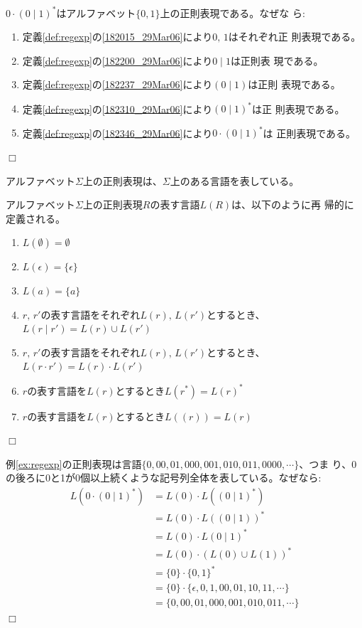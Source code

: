 \begin{example}\label{ex:regexp}
$0\cdot(0\mid 1)^\ast$はアルファベット$\{0, 1\}$上の正則表現である。なぜな
ら:
\begin{enumerate}
 \item 定義\ref{def:regexp}の\ref{182015_29Mar06}により$0,\, 1$はそれぞれ正
       則表現である。
 \item 定義\ref{def:regexp}の\ref{182200_29Mar06}により$0 \mid 1$は正則表
       現である。
 \item 定義\ref{def:regexp}の\ref{182237_29Mar06}により$(0 \mid 1)$は正則
       表現である。
 \item 定義\ref{def:regexp}の\ref{182310_29Mar06}により$(0 \mid 1)^\ast$は正
       則表現である。
 \item 定義\ref{def:regexp}の\ref{182346_29Mar06}により$0\cdot(0 \mid 1)^\ast$は
       正則表現である。
\end{enumerate}$\Box$
\end{example}

アルファベット$\Sigma$上の正則表現は、$\Sigma$上のある言語を表している。

\begin{definition}
 アルファベット$\Sigma$上の正則表現$R$の表す言語$L(R)$は、以下のように再
 帰的に定義される。
 \begin{enumerate}
  \item $L(\emptyset) = \emptyset$
  \item $L(\epsilon) = \{\epsilon\}$
  \item $L(a) = \{a\}$
	\label{182015_29Mar06}
  \item $r,\, r'$の表す言語をそれぞれ$L(r),\, L(r')$とするとき、
	$L(r \mid r') = L(r) \cup L(r')$
  \item $r,\, r'$の表す言語をそれぞれ$L(r),\, L(r')$とするとき、
	$L(r \cdot r') = L(r) \cdot L(r')$
  \item $r$の表す言語を$L(r)$とするとき$L(r^*) = L(r)^*$
  \item $r$の表す言語を$L(r)$とするとき$L((r)) = L(r)$
 \end{enumerate}$\Box$
\end{definition}

\begin{example}
 例\ref{ex:regexp}の正則表現は言語$\{0, 00, 01, 000, 001, 010, 011, 0000, \cdots\}$、つま
 り、0の後ろに0と1が0個以上続くような記号列全体を表している。なぜなら:
 \begin{align*}
 L(0\cdot (0\mid 1)^\ast) & = L(0) \cdot L((0 \mid 1)^\ast) \\
                 & = L(0) \cdot L((0 \mid 1))^\ast \\
                 & = L(0) \cdot L(0 \mid 1)^\ast \\
                 & = L(0) \cdot (L(0) \cup L(1))^\ast \\
                 & = \{0\} \cdot \{0, 1\}^\ast \\
                 & = \{0\} \cdot \{\epsilon, 0, 1, 00, 01, 10, 11, \cdots\} \\
                 & = \{0, 00, 01, 000, 001, 010, 011, \cdots\}
 \end{align*}$\Box$
\end{example}

